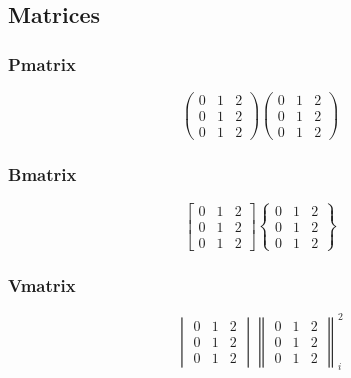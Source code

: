 \documentclass[a4paper,12pt]{article}
\begin{document}
\subsection{Matrices}

\subsubsection{Pmatrix}

\begin{equation}
    \begin{pmatrix}
        0 & 1 & 2\\
        0 & 1 & 2\\
        0 & 1 & 2
    \end{pmatrix}
    \begin{pmatrix}
        0 & 1 & 2\\
        0 & 1 & 2\\
        0 & 1 & 2
    \end{pmatrix}

\end{equation}

\subsubsection{Bmatrix}
\begin{equation}
    \begin{bmatrix}
        0 & 1 & 2\\
        0 & 1 & 2\\
        0 & 1 & 2
    \end{bmatrix}
    \begin{Bmatrix}
        0 & 1 & 2\\
        0 & 1 & 2\\
        0 & 1 & 2
    \end{Bmatrix}

\end{equation}
\subsubsection{Vmatrix}
\begin{equation}
    \begin{vmatrix}
        0 & 1 & 2\\
        0 & 1 & 2\\
        0 & 1 & 2
    \end{vmatrix}
    \begin{Vmatrix}
        0 & 1 & 2\\
        0 & 1 & 2\\
        0 & 1 & 2
    \end{Vmatrix}_{i}^2
\end{equation}
\end{document}
